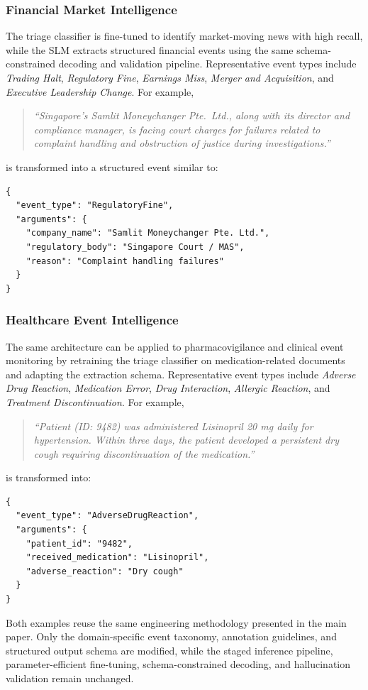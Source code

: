 \documentclass[11pt,a4paper]{article}
\begin{document}
\subsubsection{Financial Market Intelligence}
The triage classifier is fine-tuned to identify market-moving news with high recall, while the SLM extracts structured financial events using the same schema-constrained decoding and validation pipeline. Representative event types include \textit{Trading Halt}, \textit{Regulatory Fine}, \textit{Earnings Miss}, \textit{Merger and Acquisition}, and \textit{Executive Leadership Change}. For example,
\begin{quote}
\textit{``Singapore's Samlit Moneychanger Pte.\ Ltd., along with its director and compliance manager, is facing court charges for failures related to complaint handling and obstruction of justice during investigations.''}
\end{quote}
is transformed into a structured event similar to:
\begin{verbatim}
{
  "event_type": "RegulatoryFine",
  "arguments": {
    "company_name": "Samlit Moneychanger Pte. Ltd.",
    "regulatory_body": "Singapore Court / MAS",
    "reason": "Complaint handling failures"
  }
}
\end{verbatim}

\subsubsection{Healthcare Event Intelligence}
The same architecture can be applied to pharmacovigilance and clinical event monitoring by retraining the triage classifier on medication-related documents and adapting the extraction schema. Representative event types include \textit{Adverse Drug Reaction}, \textit{Medication Error}, \textit{Drug Interaction}, \textit{Allergic Reaction}, and \textit{Treatment Discontinuation}. For example,
\begin{quote}
\textit{``Patient (ID: 9482) was administered Lisinopril 20 mg daily for hypertension. Within three days, the patient developed a persistent dry cough requiring discontinuation of the medication.''}
\end{quote}
is transformed into:
\begin{verbatim}
{
  "event_type": "AdverseDrugReaction",
  "arguments": {
    "patient_id": "9482",
    "received_medication": "Lisinopril",
    "adverse_reaction": "Dry cough"
  }
}
\end{verbatim}

Both examples reuse the same engineering methodology presented in the main paper. Only the domain-specific event taxonomy, annotation guidelines, and structured output schema are modified, while the staged inference pipeline, parameter-efficient fine-tuning, schema-constrained decoding, and hallucination validation remain unchanged.
\end{document}
